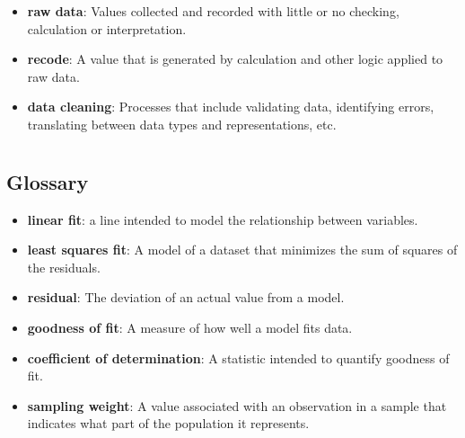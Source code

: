 \begin{itemize}
	\item {\bf raw data}: Values collected and recorded with little or no
	checking, calculation or interpretation.
	
	\item {\bf recode}: A value that is generated by calculation and other
	logic applied to raw data.
	
	\item {\bf data cleaning}: Processes that include validating data,
	identifying errors, translating between data types and
	representations, etc.
	
\end{itemize}



 \chapter{ }  \section*{Glossary} \begin{itemize}
	
	\item {\bf linear fit}: a line intended to model the relationship between
	variables.  
	
	\item {\bf least squares fit}: A model of a dataset that minimizes the
	sum of squares of the residuals.
	
	\item {\bf residual}: The deviation of an actual value from a model.
	
	\item {\bf goodness of fit}: A measure of how well a model fits data.
	
	\item {\bf coefficient of determination}: A statistic intended to
	quantify goodness of fit.
	
	\item {\bf sampling weight}: A value associated with an observation in a
	sample that indicates what part of the population it represents.
	
\end{itemize}



